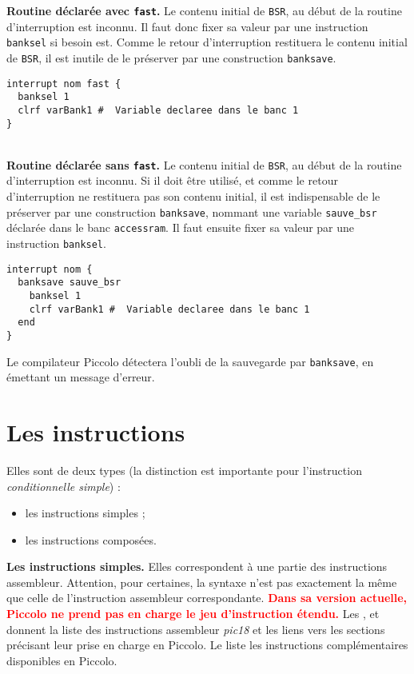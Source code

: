 \textbf{Routine déclarée avec \texttt{fast}.} Le contenu initial de \texttt{BSR}, au début de la routine d’interruption est inconnu. Il faut donc fixer sa valeur par une instruction \texttt{banksel} si besoin est. Comme le retour d’interruption restituera le contenu initial de \texttt{BSR}, il est inutile de le préserver par une construction \texttt{banksave}.

\begin{lstlisting}[language=piccolo]
interrupt nom fast {
  banksel 1
  clrf varBank1 #  Variable declaree dans le banc 1
}
\end{lstlisting}

~\\
\textbf{Routine déclarée sans \texttt{fast}.} Le contenu initial de \texttt{BSR}, au début de la routine d’interruption est inconnu. Si il doit être utilisé, et comme le retour d’interruption ne restituera pas son contenu initial, il est indispensable de le préserver par une construction \texttt{banksave}, nommant une variable \texttt{sauve\_bsr} déclarée dans le banc \texttt{accessram}. Il faut ensuite fixer sa valeur par une instruction \texttt{banksel}. 

\begin{lstlisting}[language=piccolo]
interrupt nom {
  banksave sauve_bsr
    banksel 1
    clrf varBank1 #  Variable declaree dans le banc 1
  end
}
\end{lstlisting}

Le compilateur Piccolo détectera l’oubli de la sauvegarde par \texttt{banksave}, en émettant un message d’erreur.


\section{Les instructions}

Elles sont de deux types (la distinction est importante pour l’instruction \emph{conditionnelle simple}) :
\begin{itemize}
  \item les instructions simples ;
  \item les instructions composées.

\end{itemize}


\textbf{Les instructions simples.} Elles correspondent à une partie des instructions assembleur. Attention, pour certaines, la syntaxe n'est pas exactement la même que celle de l'instruction assembleur correspondante. \textcolor{red}{\bf Dans sa version actuelle, Piccolo ne prend pas en charge le jeu d'instruction étendu.} Les ,   et  donnent la liste des instructions assembleur \emph{pic18} et les liens vers les sections précisant leur prise en charge en Piccolo. Le  liste les instructions complémentaires disponibles en Piccolo.
 
